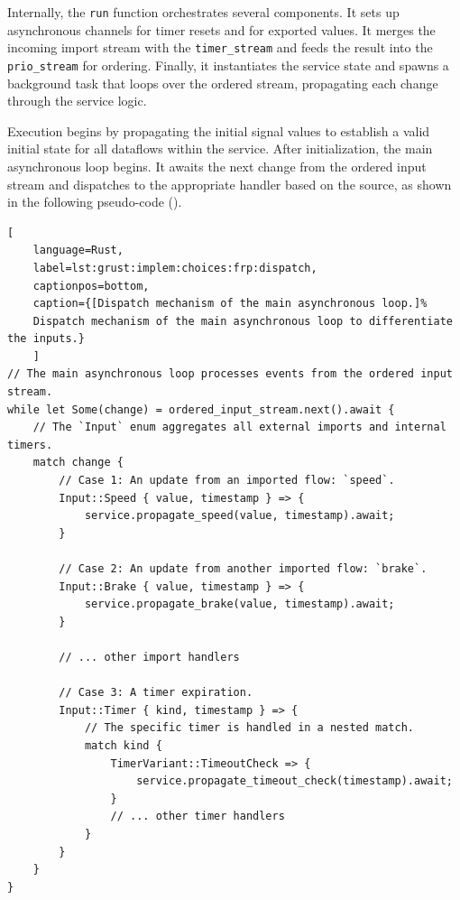 Internally, the \texttt{run} function orchestrates several components. It sets up asynchronous
channels for timer resets and for exported values. It merges the incoming import stream with the
\texttt{timer\_stream} and feeds the result into the \texttt{prio\_stream} for ordering. Finally, it
instantiates the service state and spawns a background task that loops over the ordered stream,
propagating each change through the service logic.

Execution begins by propagating the initial signal values to establish a valid initial state for all
dataflows within the service. After initialization, the main asynchronous loop begins. It awaits the
next change from the ordered input stream and dispatches to the appropriate handler based on the
source, as shown in the following pseudo-code ().
\begin{lstlisting}[
    language=Rust,
    label=lst:grust:implem:choices:frp:dispatch,
    captionpos=bottom,
    caption={[Dispatch mechanism of the main asynchronous loop.]%
    Dispatch mechanism of the main asynchronous loop to differentiate the inputs.}
    ]
// The main asynchronous loop processes events from the ordered input stream.
while let Some(change) = ordered_input_stream.next().await {
    // The `Input` enum aggregates all external imports and internal timers.
    match change {
        // Case 1: An update from an imported flow: `speed`.
        Input::Speed { value, timestamp } => {
            service.propagate_speed(value, timestamp).await;
        }
        
        // Case 2: An update from another imported flow: `brake`.
        Input::Brake { value, timestamp } => {
            service.propagate_brake(value, timestamp).await;
        }
        
        // ... other import handlers
        
        // Case 3: A timer expiration.
        Input::Timer { kind, timestamp } => {
            // The specific timer is handled in a nested match.
            match kind {
                TimerVariant::TimeoutCheck => {
                    service.propagate_timeout_check(timestamp).await;
                }
                // ... other timer handlers
            }
        }
    }
}
\end{lstlisting}

